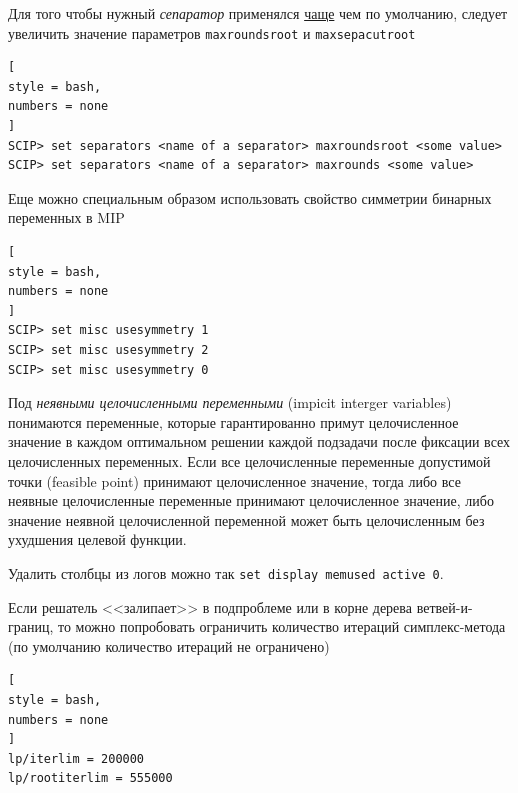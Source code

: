 \documentclass[%
	11pt,
	a4paper,
	utf8,
		]{article}
\begin{document}
Для того чтобы нужный \emph{сепаратор} применялся \underline{чаще} чем по умолчанию, следует увеличить значение параметров \verb|maxroundsroot| и \verb|maxsepacutroot|
\begin{lstlisting}[
style = bash,
numbers = none
]
SCIP> set separators <name of a separator> maxroundsroot <some value>
SCIP> set separators <name of a separator> maxrounds <some value>
\end{lstlisting}

Еще можно специальным образом использовать свойство симметрии бинарных переменных в MIP
\begin{lstlisting}[
style = bash,
numbers = none
]
SCIP> set misc usesymmetry 1
SCIP> set misc usesymmetry 2
SCIP> set misc usesymmetry 0
\end{lstlisting}

Под \emph{неявными целочисленными переменными} (impicit interger variables) понимаются переменные, которые гарантированно примут целочисленное значение в каждом оптимальном решении каждой подзадачи после фиксации всех целочисленных переменных. Если все целочисленные переменные допустимой точки (feasible point) принимают целочисленное значение, тогда либо все неявные целочисленные переменные принимают целочисленное значение, либо значение неявной целочисленной переменной может быть целочисленным без ухудшения целевой функции.

Удалить столбцы из логов можно так \verb|set display memused active 0|.


Если решатель <<залипает>> в подпроблеме или в корне дерева ветвей-и-границ, то можно попробовать ограничить количество итераций симплекс-метода (по умолчанию количество итераций не ограничено)
\begin{lstlisting}[
style = bash,
numbers = none
]
lp/iterlim = 200000
lp/rootiterlim = 555000
\end{lstlisting}



\listoffigures{}

\begin{thebibliography}{99}
	
	
	
		
\end{thebibliography}
\end{document}
